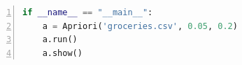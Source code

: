 \documentclass[12pt,a4paper]{article}
\theoremstyle{definition}
\begin{document}
\begin{appendix}
\begin{lstlisting}[language=Python,
	numbers=left,
	keywordstyle=\color{blue!70},
	frame=shadowbox,
	breaklines=True]
if __name__ == "__main__":
    a = Apriori('groceries.csv', 0.05, 0.2)
    a.run()
    a.show()
	\end{lstlisting}
	
\end{appendix}

\end{document}
